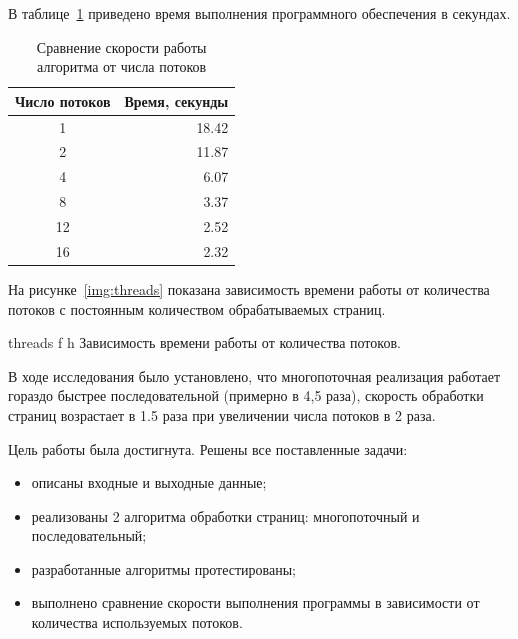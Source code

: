 В таблице~\ref{tbl:research} приведено время выполнения
программного обеспечения в секундах.

\begin{table}[h]
    \begin{center}
        \caption{\label{tbl:research} Сравнение скорости работы алгоритма от числа потоков}
        \begin{tabular}{|c|r|}
            \hline
            Число потоков & Время, секунды
            \\ \hline
            1 & 18.42
            \\ \hline
            2 & 11.87
            \\ \hline
            4 & 6.07
            \\ \hline
            8 & 3.37
            \\ \hline
            12 & 2.52
            \\ \hline
            16 & 2.32
            \\ \hline
        \end{tabular}
    \end{center}
\end{table}

На рисунке~\ref{img:threads} показана зависимость времени работы от количества
потоков с постоянным количеством обрабатываемых страниц.

\FloatBarrier
{}
{threads}
{f}
{h}
{\textwidth}
{Зависимость времени работы от количества потоков.}
\FloatBarrier


В ходе исследования было установлено, что многопоточная реализация работает гораздо быстрее последовательной
(примерно в 4,5 раза), скорость обработки страниц возрастает в 1.5 раза при увеличении числа потоков в 2 раза.

Цель работы была достигнута.
Решены все поставленные задачи:
\begin{itemize}
    \item описаны входные и выходные данные;
    \item реализованы 2 алгоритма обработки страниц: многопоточный и последовательный;
    \item разработанные алгоритмы протестированы;
    \item выполнено сравнение скорости выполнения программы в зависимости от количества используемых потоков.
\end{itemize}
